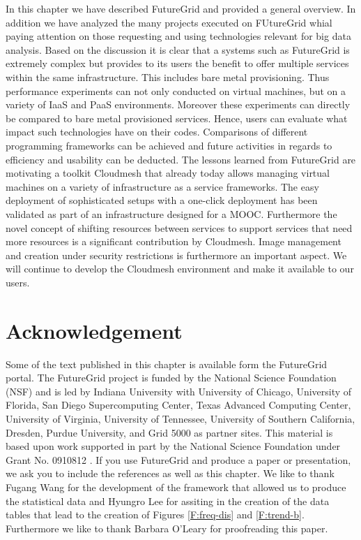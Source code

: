 \documentclass[graybox]{svmult}
\begin{document}
In this chapter we have described FutureGrid and provided a general overview. In addition we have analyzed the many projects executed on FUtureGrid whial paying attention on those requesting and using technologies relevant for big data analysis. Based on the discussion it is clear that a systems such as FutureGrid is extremely complex but provides to its users the benefit to offer multiple services within the same infrastructure. This includes bare metal provisioning. Thus performance experiments can not only conducted on virtual machines, but on a variety of IaaS and PaaS environments. Moreover these experiments can directly be compared to bare metal provisioned services. Hence, users can evaluate what impact such technologies have on their codes. Comparisons of different programming frameworks can be achieved and future activities in regards to efficiency and usability can be deducted. The lessons learned from FutureGrid are motivating a toolkit Cloudmesh that already today allows managing virtual machines on a variety of infrastructure as a service frameworks. The easy deployment of sophisticated setups with a one-click deployment has been validated as part of an infrastructure designed for a MOOC. Furthermore the novel concept of shifting resources \cite{las08federated-cloud} between services to support services that need more resources is a significant contribution by Cloudmesh. Image management and creation under security restrictions \cite{fg-1295} is furthermore an important aspect. We will continue to develop the Cloudmesh environment and make it available to our users.




\section*{Acknowledgement}

Some of the text published in this chapter is available form the FutureGrid portal.  The FutureGrid project is funded by the National Science Foundation (NSF) and is led by Indiana University with University of Chicago, University of Florida, San Diego Supercomputing Center, Texas Advanced Computing Center, University of Virginia, University of Tennessee, University of Southern California, Dresden, Purdue University, and Grid 5000 as partner sites. This material is based upon work supported in part by the National Science Foundation under Grant No. 0910812 \cite{las12fg-bookchapter}. If you use FutureGrid and produce a paper or presentation, we ask you to include the references \cite{las2010gce,las12fg-bookchapter} as well as this chapter.  We like to thank Fugang Wang for the development of the framework that allowed us to produce the statistical data and Hyungro Lee for assiting in the creation of the data tables that lead to the creation of Figures \ref{F:freq-dis} and \ref{F:trend-b}. Furthermore we like to thank Barbara O'Leary for proofreading this paper.










%

\clearpage
\printindex
\end{document}
